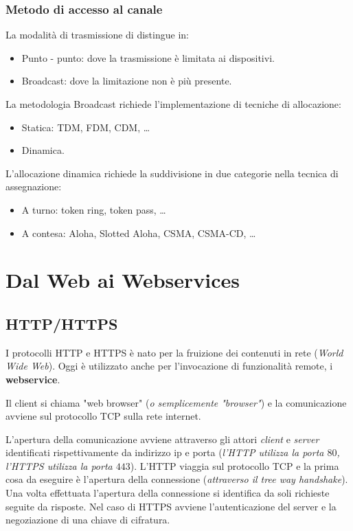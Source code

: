 \documentclass[oneside,a4paper,11pt]{book}
\theoremstyle{italicstyle}
\theoremstyle{normStyle}
\begin{document}
\subsection{Metodo di accesso al canale}
La modalità di trasmissione di distingue in:
\begin{itemize}
  \item Punto - punto: dove la trasmissione è limitata ai dispositivi.
  \item Broadcast: dove la limitazione non è più presente.
\end{itemize}
La metodologia Broadcast richiede l'implementazione di tecniche di allocazione:
\begin{itemize}
  \item Statica: TDM, FDM, CDM, \dots 
  \item Dinamica.
\end{itemize}
L'allocazione dinamica richiede la suddivisione in due categorie nella 
tecnica di assegnazione:
\begin{itemize}
  \item A turno: token ring, token pass, \dots
  \item A contesa: Aloha, Slotted Aloha, CSMA, CSMA-CD, \dots
\end{itemize}

\chapter{Dal Web ai Webservices}
\section{HTTP/HTTPS}
I protocolli HTTP e HTTPS è nato per la fruizione dei contenuti in rete (\textit{World Wide Web}). 
Oggi è utilizzato anche per l'invocazione di funzionalità remote, i \textbf{webservice}.

Il client si chiama "web browser" (\textit{o semplicemente "browser"}) e la 
comunicazione avviene sul protocollo TCP sulla rete internet.

L'apertura della comunicazione avviene attraverso gli attori \textit{client} e 
\textit{server} identificati rispettivamente da indirizzo ip e porta (\textit{l'HTTP 
utilizza la porta $80$, l'HTTPS utilizza la porta $443$}). 
L'HTTP viaggia sul protocollo TCP e la prima cosa da eseguire è l'apertura della
connessione (\textit{attraverso il tree way handshake}). 
Una volta effettuata l'apertura della connessione si identifica da soli richieste seguite da 
risposte.
Nel caso di HTTPS avviene l'autenticazione del server e la negoziazione 
di una chiave di cifratura.
\end{document}
